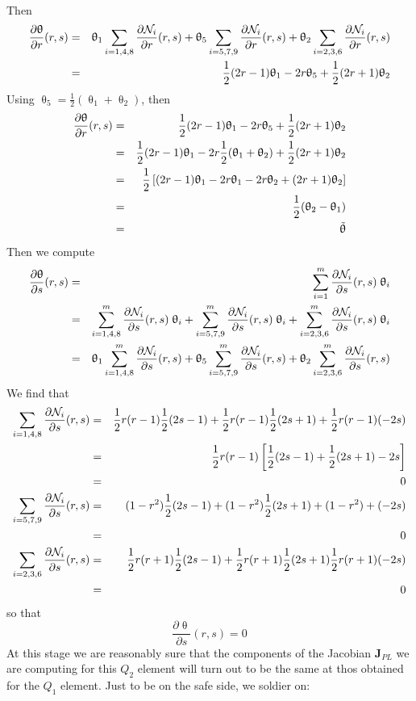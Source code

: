 Then 
\begin{eqnarray}
\frac{\partial\uptheta}{\partial r}(r,s) 
&=& \uptheta_1\sum_{i=1,4,8} \frac{\partial {\mathcal{N}}_i}{\partial r}(r,s) 
+\uptheta_5\sum_{i=5,7,9} \frac{\partial {\mathcal{N}}_i}{\partial r}(r,s)  
+\uptheta_2\sum_{i=2,3,6} \frac{\partial {\mathcal{N}}_i}{\partial r}(r,s)  \nonumber\\
&=&  \frac{1}{2}(2r-1) \uptheta_1 -2r \uptheta_5 + \frac{1}{2}(2r+1) \uptheta_2
\end{eqnarray}
Using $\uptheta_5=\frac12 (\uptheta_1+\uptheta_2)$, then
\begin{eqnarray}
\frac{\partial\uptheta}{\partial r}(r,s) 
&=&  \frac{1}{2}(2r-1) \uptheta_1 -2r \uptheta_5 + \frac{1}{2}(2r+1) \uptheta_2 \nonumber\\
&=&  \frac{1}{2}(2r-1) \uptheta_1 -2r \frac12 (\uptheta_1+\uptheta_2) + \frac{1}{2}(2r+1) \uptheta_2 \nonumber\\
&=& \frac12 \left[ (2r-1) \uptheta_1 -2r \uptheta_1 -2r\uptheta_2 + (2r+1) \uptheta_2  \right] \nonumber\\
&=& \frac12 (\uptheta_2-\uptheta_1) \nonumber\\
&=& \tilde{\uptheta}
\end{eqnarray}
Then we compute 
\begin{eqnarray}
\frac{\partial\uptheta}{\partial s}(r,s) 
&=& \sum_{i=1}^m \frac{\partial{\mathcal{N}}_i}{\partial s}(r,s)\; \uptheta_i  \nonumber\\ 
&=&\sum_{i=1,4,8}^m \frac{\partial{\mathcal{N}}_i}{\partial s}(r,s)\; \uptheta_i  
+  \sum_{i=5,7,9}^m \frac{\partial{\mathcal{N}}_i}{\partial s}(r,s)\; \uptheta_i  
+  \sum_{i=2,3,6}^m \frac{\partial{\mathcal{N}}_i}{\partial s}(r,s)\; \uptheta_i  \nonumber\\ 
&=& \uptheta_1 \sum_{i=1,4,8}^m \frac{\partial{\mathcal{N}}_i}{\partial s}(r,s) 
+   \uptheta_5 \sum_{i=5,7,9}^m \frac{\partial{\mathcal{N}}_i}{\partial s}(r,s) 
+   \uptheta_2 \sum_{i=2,3,6}^m \frac{\partial{\mathcal{N}}_i}{\partial s}(r,s) 
\end{eqnarray}
We find that 
\begin{eqnarray}
\sum_{i=1,4,8} \frac{\partial {\mathcal{N}}_i}{\partial s}(r,s)
&=& \frac{1}{2}r(r-1)  \frac{1}{2}(2s-1) + 
\frac{1}{2}r(r-1)  \frac{1}{2}(2s+1) +
\frac{1}{2}r(r-1)        (-2s)  \nonumber\\
&=& \frac{1}{2}r(r-1) \left[ \frac{1}{2}(2s-1)+   \frac{1}{2}(2s+1) -2s\right] \nonumber\\
&=& 0 \nonumber\\
\sum_{i=5,7,9} \frac{\partial {\mathcal{N}}_i}{\partial s}(r,s)
&=&   (1-r^2)  \frac{1}{2}(2s-1) +      (1-r^2)  \frac{1}{2}(2s+1) +  (1-r^2)   +     (-2s)   \nonumber\\
&=& 0 \nonumber\\
\sum_{i=2,3,6} \frac{\partial {\mathcal{N}}_i}{\partial s}(r,s)
&=&   \frac{1}{2}r(r+1)  \frac{1}{2}(2s-1) + \frac{1}{2}r(r+1)  \frac{1}{2}(2s+1) \frac{1}{2}r(r+1)  (-2s) \nonumber\\
&=& 0 
\end{eqnarray}
so that 
\[
\frac{\partial\uptheta}{\partial s}(r,s)  =0
\]
At this stage we are reasonably sure that the components of the Jacobian ${\bm J}_{PL}$ we are computing
for this $Q_2$ element will turn out to be the same at thos obtained for the $Q_1$ element. 
Just to be on the safe side, we soldier on:

